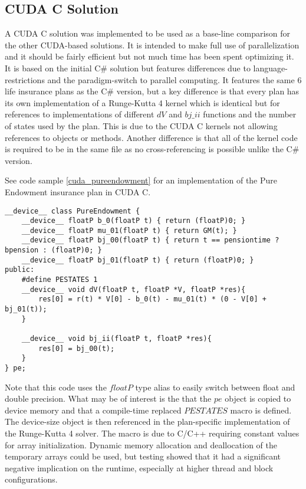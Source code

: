 \subsection{CUDA C Solution}
A CUDA C solution was implemented to be used as a base-line comparison for the other CUDA-based solutions.
It is intended to make full use of parallelization and it should be fairly efficient but not much time has been spent optimizing it.
It is based on the initial C\# solution but features differences due to language-restrictions and the paradigm-switch to parallel computing.
It features the same 6 life insurance plans as the C\# version, but a key difference is that every plan has its own implementation of a Runge-Kutta 4 kernel which is identical but for references to implementations of different $dV$ and $bj\_ii$ functions and the number of states used by the plan.
This is due to the CUDA C kernels not allowing references to objects or methods. %
Another difference is that all of the kernel code is required to be in the same file as no cross-referencing is possible unlike the C\# version.

See code sample \ref{cuda_pureendowment} for an implementation of the Pure Endowment insurance plan in CUDA C.
\begin{lstlisting}[language=cudac, caption=The pure endowment insurance plan expressed in CUDA C, label=cuda_pureendowment]
__device__ class PureEndowment {
	__device__ floatP b_0(floatP t) { return (floatP)0; }
	__device__ floatP mu_01(floatP t) { return GM(t); }
	__device__ floatP bj_00(floatP t) { return t == pensiontime ? bpension : (floatP)0; }
	__device__ floatP bj_01(floatP t) { return (floatP)0; }
public:
	#define PESTATES 1
	__device__ void dV(floatP t, floatP *V, floatP *res){ 
		res[0] = r(t) * V[0] - b_0(t) - mu_01(t) * (0 - V[0] + bj_01(t));
	}

	__device__ void bj_ii(floatP t, floatP *res){
		res[0] = bj_00(t);
	}
} pe;
\end{lstlisting}

Note that this code uses the $floatP$ type alias to easily switch between float and double precision.
What may be of interest is the that the $pe$ object is copied to device memory and that a compile-time replaced $PESTATES$ macro is defined.
The device-size object is then referenced in the plan-specific implementation of the Runge-Kutta 4 solver.
The macro is due to C/C++ requiring constant values for array initialization.
Dynamic memory allocation and deallocation of the temporary arrays could be used, but testing showed that it had a significant negative implication on the runtime, especially at higher thread and block configurations.

